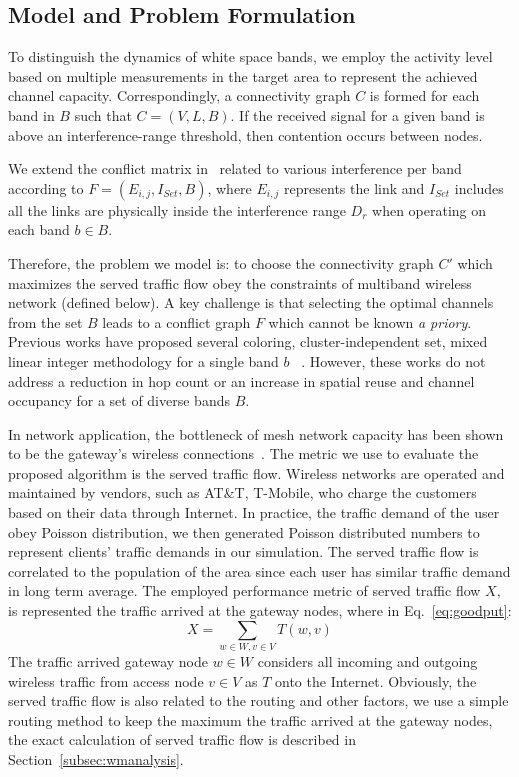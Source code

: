 \subsection{Model and Problem Formulation}
\label{subsec:problem}

To distinguish the dynamics of white space bands, we employ the activity level based on multiple measurements 
in the target area to represent the achieved channel capacity. Correspondingly, a connectivity graph $C$ is 
formed for each band in $B$ such that $C=(V,L,B)$.  If the received signal for a given band is above an 
interference-range threshold, then contention occurs between nodes. 

We extend the conflict matrix in~\cite{tang2005interference} related to various interference per band according 
to $F=(E_{i,j},I_{Set},B)$, where $E_{i,j}$ represents the link and $I_{Set}$ includes all the links are physically 
inside the interference range $D_r$ when operating on each band $b \in B$.

Therefore, the problem we model is: to choose the connectivity graph $C'$ which maximizes the served traffic flow obey 
the constraints of multiband wireless network (defined below). A key challenge is that selecting the optimal channels from
the set $B$ leads to a conflict graph $F$ which cannot be known {\it a priory}. Previous works have proposed several 
coloring, cluster-independent set, mixed linear integer methodology for a single band $b$
~\cite{peng2012efficient,tang2005interference,doraghinejad2014channel}. 
However, these works do not address a reduction in hop count or an increase in spatial reuse and channel occupancy for 
a set of diverse bands $B$. 

In network application, the bottleneck of mesh network capacity has been shown to be the gateway's wireless 
connections~\cite{robinson2008adding}. The metric we use to evaluate the proposed algorithm is the served traffic flow.
Wireless networks are operated and maintained by vendors, such as AT\&T, T-Mobile, who charge the customers based on their data 
through Internet. In practice, the traffic demand of the user obey Poisson distribution\cite{saaty1961elements}, 
we then generated Poisson distributed numbers to represent clients' traffic demands in our simulation. The served traffic 
flow is correlated to the population of the area since each user has similar traffic demand in long term average. The 
employed performance metric of served traffic flow $X$, is represented the traffic arrived at the gateway nodes, where 
in Eq.~\ref{eq:goodput}:
\begin{equation}
\label{eq:goodput}
X=\sum_{w \in W, v \in V}T(w,v)
\end{equation}
The traffic arrived gateway node $w\in W$ considers all incoming and outgoing wireless traffic from access node $v\in V$ 
as $T$ onto the Internet. Obviously, the served traffic flow is also related to the routing and other factors, we use a 
simple routing method to keep the maximum the traffic arrived at the gateway nodes, the exact calculation of served traffic
flow is described in Section~\ref{subsec:wmanalysis}.

